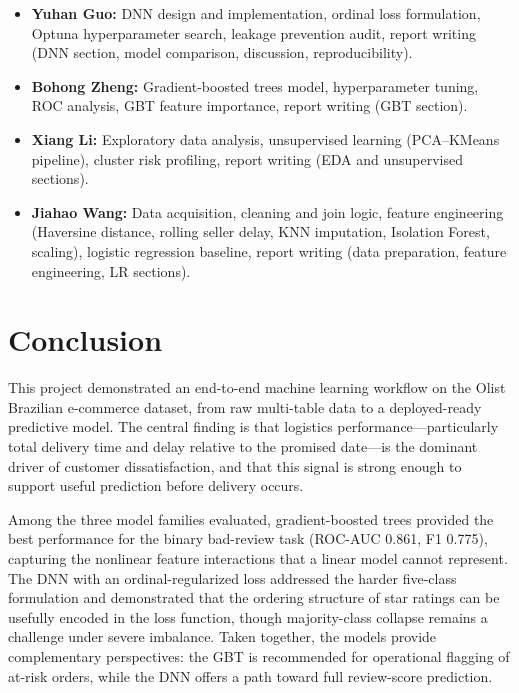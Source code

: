 \documentclass[11pt]{article}
\begin{document}
\begin{itemize}[leftmargin=1.5em]
    \item \textbf{Yuhan Guo:} DNN design and implementation, ordinal loss formulation, Optuna hyperparameter search, leakage prevention audit, report writing (DNN section, model comparison, discussion, reproducibility).
    \item \textbf{Bohong Zheng:} Gradient-boosted trees model, hyperparameter tuning, ROC analysis, GBT feature importance, report writing (GBT section).
    \item \textbf{Xiang Li:} Exploratory data analysis, unsupervised learning (PCA--KMeans pipeline), cluster risk profiling, report writing (EDA and unsupervised sections).
    \item \textbf{Jiahao Wang:} Data acquisition, cleaning and join logic, feature engineering (Haversine distance, rolling seller delay, KNN imputation, Isolation Forest, scaling), logistic regression baseline, report writing (data preparation, feature engineering, LR sections).
\end{itemize}

\section{Conclusion}

This project demonstrated an end-to-end machine learning workflow on the Olist Brazilian e-commerce dataset, from raw multi-table data to a deployed-ready predictive model. The central finding is that logistics performance---particularly total delivery time and delay relative to the promised date---is the dominant driver of customer dissatisfaction, and that this signal is strong enough to support useful prediction before delivery occurs.

Among the three model families evaluated, gradient-boosted trees provided the best performance for the binary bad-review task (ROC-AUC 0.861, F1 0.775), capturing the nonlinear feature interactions that a linear model cannot represent. The DNN with an ordinal-regularized loss addressed the harder five-class formulation and demonstrated that the ordering structure of star ratings can be usefully encoded in the loss function, though majority-class collapse remains a challenge under severe imbalance. Taken together, the models provide complementary perspectives: the GBT is recommended for operational flagging of at-risk orders, while the DNN offers a path toward full review-score prediction.
\end{document}
